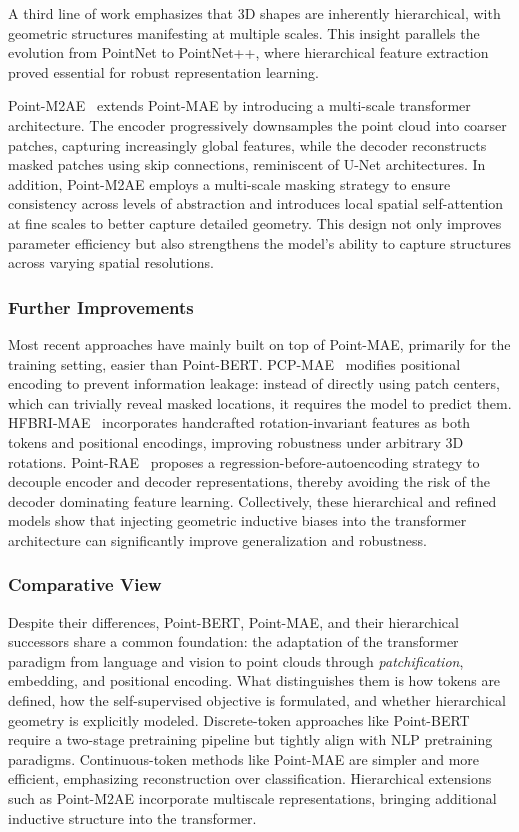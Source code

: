A third line of work emphasizes that 3D shapes are inherently hierarchical, with geometric structures manifesting at multiple scales. This insight parallels the evolution from PointNet to PointNet++, where hierarchical feature extraction proved essential for robust representation learning. 

Point-M2AE~\cite{pm2ae} extends Point-MAE by introducing a multi-scale transformer architecture. The encoder progressively downsamples the point cloud into coarser patches, capturing increasingly global features, while the decoder reconstructs masked patches using skip connections, reminiscent of U-Net architectures. In addition, Point-M2AE employs a multi-scale masking strategy to ensure consistency across levels of abstraction and introduces local spatial self-attention at fine scales to better capture detailed geometry. This design not only improves parameter efficiency but also strengthens the model’s ability to capture structures across varying spatial resolutions.

\subsubsection{Further Improvements}
\label{sssec:further_improvements}

Most recent approaches have mainly built on top of Point-MAE, primarily for the training setting, easier than Point-BERT. PCP-MAE~\cite{pcpmae} modifies positional encoding to prevent information leakage: instead of directly using patch centers, which can trivially reveal masked locations, it requires the model to predict them. HFBRI-MAE~\cite{hfbrimae} incorporates handcrafted rotation-invariant features as both tokens and positional encodings, improving robustness under arbitrary 3D rotations. Point-RAE~\cite{prae} proposes a regression-before-autoencoding strategy to decouple encoder and decoder representations, thereby avoiding the risk of the decoder dominating feature learning. Collectively, these hierarchical and refined models show that injecting geometric inductive biases into the transformer architecture can significantly improve generalization and robustness.

\subsubsection{Comparative View}
\label{sssec:comparative_view}

Despite their differences, Point-BERT, Point-MAE, and their hierarchical successors share a common foundation: the adaptation of the transformer paradigm from language and vision to point clouds through \textit{patchification}, embedding, and positional encoding. What distinguishes them is how tokens are defined, how the self-supervised objective is formulated, and whether hierarchical geometry is explicitly modeled. Discrete-token approaches like Point-BERT require a two-stage pretraining pipeline but tightly align with NLP pretraining paradigms. Continuous-token methods like Point-MAE are simpler and more efficient, emphasizing reconstruction over classification. Hierarchical extensions such as Point-M2AE incorporate multiscale representations, bringing additional inductive structure into the transformer.


